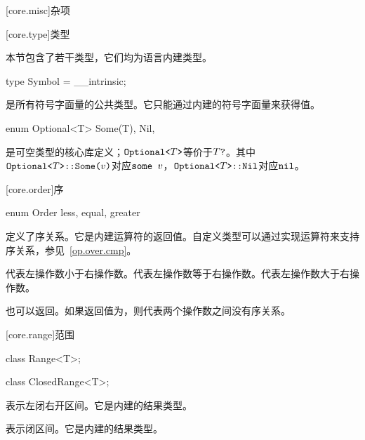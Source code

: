 
[core.misc]{杂项}

[core.type]{类型}

\pnum
本节包含了若干类型，它们均为语言内建类型。

\begin{itemdecl}
type Symbol = __intrinsic;
\end{itemdecl}

\pnum
{}是所有符号字面量的公共类型。它只能通过内建的符号字面量来获得值。

\begin{itemdecl}
enum Optional<T> {
    Some(T),
    Nil,
}
\end{itemdecl}

\pnum
{}是可空类型的核心库定义；$\texttt{Optional<}T\texttt{>}$等价于$T\texttt{?}$。其中$\texttt{Optional<}T\texttt{>::Some(}v\texttt{)}$对应$\texttt{some }v$，$\texttt{Optional<}T\texttt{>::Nil}$对应$\texttt{nil}$。

[core.order]{序}

\begin{itemdecl}
enum Order {
    less,
    equal,
    greater
}
\end{itemdecl}

\pnum
{}定义了序关系。它是内建运算符的返回值。自定义类型可以通过实现运算符来支持序关系，参见~\ref{op.over.cmp}。

\pnum
{}代表左操作数小于右操作数。代表左操作数等于右操作数。代表左操作数大于右操作数。

\pnum
{}也可以返回。如果返回值为，则代表两个操作数之间没有序关系。

[core.range]{范围}

\begin{itemdecl}
class Range<T>;
\end{itemdecl}

\begin{itemdecl}
class ClosedRange<T>;
\end{itemdecl}

\pnum
{}表示左闭右开区间。它是内建的结果类型。

\pnum
{}表示闭区间。它是内建的结果类型。

